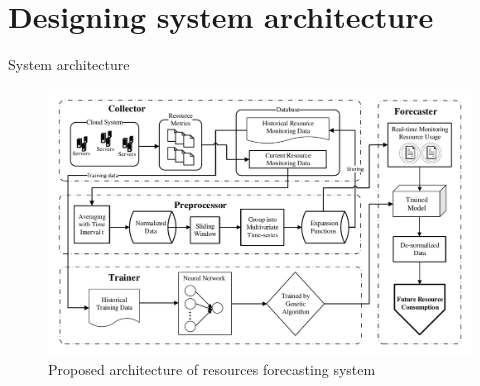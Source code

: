\documentclass{beamer}
\begin{document}


\section{Designing system architecture}
\begin{frame}{System architecture}
	\begin{figure}
		\centering
		\includegraphics[scale=0.45]{FLGANN_system.pdf}
		\caption*{Proposed architecture of resources forecasting system}
		\label{fig:overall}
	\end{figure}
\end{frame}
\end{document}
